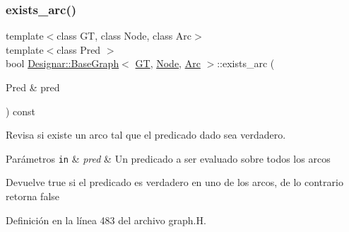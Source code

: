 \subsubsection{\texorpdfstring{exists\+\_\+arc()}{exists\_arc()}\hspace{0.1cm}{\footnotesize\ttfamily [1/2]}}
{\footnotesize\ttfamily template$<$class GT, class Node, class Arc$>$ \\
template$<$class Pred $>$ \\
bool \hyperlink{class_designar_1_1_base_graph}{Designar\+::\+Base\+Graph}$<$ \hyperlink{demo-buildgraph_8_c_a3001c40d2c31ca87ed96cd7d1334a55e}{GT}, \hyperlink{namespace_designar_a5af326c65aa2bd26b26c410f2030d09e}{Node}, \hyperlink{namespace_designar_a3f55fb5513d62ff47cbc8f72b8e95d6f}{Arc} $>$\+::exists\+\_\+arc (\begin{DoxyParamCaption}\item[{Pred \&}]{pred }\end{DoxyParamCaption}) const\hspace{0.3cm}{\ttfamily [inline]}}



Revisa si existe un arco tal que el predicado dado sea verdadero. 


\begin{DoxyParams}[1]{Parámetros}
\mbox{\tt in}  & {\em pred} & Un predicado a ser evaluado sobre todos los arcos \\
\hline
\end{DoxyParams}
\begin{DoxyReturn}{Devuelve}
{\ttfamily true} si el predicado es verdadero en uno de los arcos, de lo contrario retorna {\ttfamily false} 
\end{DoxyReturn}


Definición en la línea 483 del archivo graph.\+H.

\mbox{\label{class_designar_1_1_base_graph_aebf517d972db553b03f2c4dbe4228d79}} 

